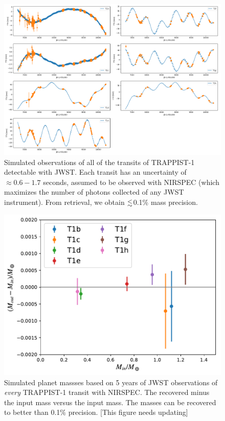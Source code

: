 \documentclass[twocolumn]{aastex63}
\begin{document}
\begin{figure}
    \centering
    \includegraphics[width=\hsize]{figures/T1_JWST_all_transits_tight.png}
    \caption{Simulated observations of all of the transits of TRAPPIST-1
    detectable with JWST.  Each transit has an
    uncertainty of ${\approx} 0.6-1.7   $ seconds, assumed to be observed with
    NIRSPEC (which maximizes the number of photons collected of any JWST
    instrument).  From retrieval, we obtain
    ${\lesssim}$0.1\% mass precision.}
    \label{fig:JWST_all_the_transits}
\end{figure}

\begin{figure}
    \centering
    \includegraphics[width=\hsize]{figures/Recovered_masses_JWST_5yr_all_transits_NIRSPEC.pdf}
    \caption{Simulated planet massses based on 5 years of JWST observations
    of \emph{every} TRAPPIST-1 transit with NIRSPEC.  The recovered minus
    the input mass versus the input mass.  The masses can be recovered to
    better than 0.1\% precision. [This figure needs updating]}
    \label{fig:JWST_all_mass}
\end{figure}
\end{document}
